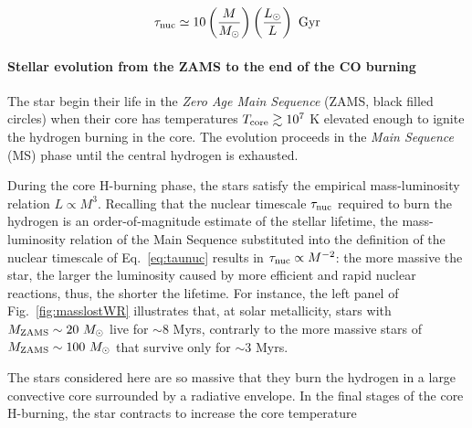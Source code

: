 \documentclass[a4paper,titlepage]{book}     	%
\newcommand{\sun}{\ensuremath{_\odot}}
\newcommand{\mzams}{M_\textup{ZAMS}}
\newcommand{\msun}{\ensuremath{M\sun}}
\begin{document}
\begin{equation}\label{eq:taunuc}
\tau_\textup{nuc} \simeq 10 \left(\frac{M}{M\sun}\right) \left(\frac{L\sun}{L}\right)\ \text{Gyr}
\end{equation}

\paragraph{Stellar evolution from the ZAMS to the end of the CO burning} The star begin their life in the \emph{Zero Age Main Sequence} (ZAMS, black filled circles) when their core has temperatures $T_{\rm core} \gtrsim 10^{7}$ K elevated enough to ignite the hydrogen burning in the core. The evolution proceeds in the \emph{Main Sequence} (MS) phase until the central hydrogen is exhausted. 

During the core H-burning phase, the stars satisfy the empirical mass-luminosity relation $L \propto M^3$. Recalling that the nuclear timescale $\tau_{\rm nuc}$ required to burn the hydrogen is an order-of-magnitude estimate of the stellar lifetime, the mass-luminosity relation of the Main Sequence substituted into the definition of the nuclear timescale of Eq.\ \ref{eq:taunuc} results in $\tau_{\rm nuc} \propto M^{-2}$: the more massive the star, the larger the luminosity caused by more efficient and rapid nuclear reactions, thus, the shorter the lifetime. For instance, the left panel of Fig.\ \ref{fig:masslostWR} illustrates that, at solar metallicity, stars with $\mzams \sim 20~\msun$ live for $\sim 8$ Myrs, contrarly to the more massive stars of $\mzams \sim 100~\msun$ that survive only for $\sim 3$ Myrs.

The stars considered here are so massive that they burn the hydrogen in a large convective core surrounded by a radiative envelope. In the final stages of the core H-burning, the star contracts to increase the core temperature
\end{document}
